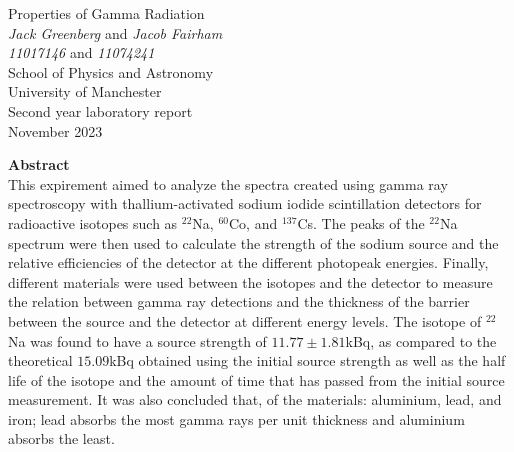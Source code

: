 \documentclass[11pt]{article} %
\begin{document}


\begin{titlepage} %
\begin{center} %

{\Huge Properties of Gamma Radiation}\\[0.5cm] %
\textit{Jack Greenberg} and \textit{Jacob Fairham}~\\[0.3cm] %
\textit{11017146} and \textit{11074241}~\\[0.3cm]
School of Physics and Astronomy~\\[0.3cm]
University of Manchester~\\[0.3cm]
Second year laboratory report~\\[0.3cm]
November 2023~\\[2cm]


\end{center}
{\Large \textbf{Abstract}}~\\[0.3cm]
 This expirement aimed to analyze the spectra created using gamma ray spectroscopy with thallium-activated sodium iodide scintillation detectors for radioactive isotopes such as $^{22}$Na, $^{60}$Co, and $^{137}$Cs. The peaks of the $^{22}$Na spectrum were then used to calculate the strength of the sodium source and the relative efficiencies of the detector at the different photopeak energies. Finally, different materials were used between the isotopes and the detector to measure the relation between gamma ray detections and the thickness of the barrier between the source and the detector at different energy levels. The isotope of $^{22}$Na was found to have a source strength of $11.77\pm1.81$kBq, as compared to the theoretical $15.09$kBq obtained using the initial source strength as well as the half life of the isotope and the amount of time that has passed from the initial source measurement. It was also concluded that, of the materials: aluminium, lead, and iron; lead absorbs the most gamma rays per unit thickness and aluminium absorbs the least.

\end{titlepage}
\clearpage
{} %
\setcounter{page}{2} %
\end{document}
